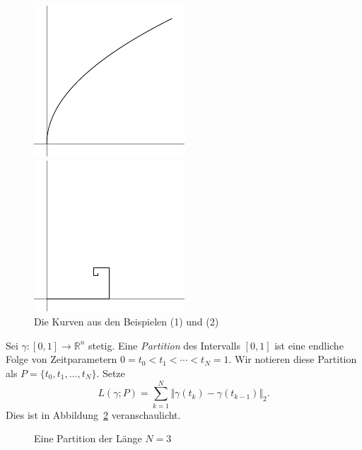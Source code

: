 \documentclass[../main.tex]{subfiles}
\begin{document}
\begin{figure}[htb] 
  \centering
  \begin{minipage}{0.50\textwidth}
    \centering
    \includegraphics{figures/sqrt}
  \end{minipage}%
  \begin{minipage}{0.50\textwidth}
    \centering
    \includegraphics{figures/spiral}
  \end{minipage}%
  \caption{Die Kurven aus den Beispielen (1) und (2)}%
  \label{fig:rectifiability}
\end{figure}

\begin{definition}
  Sei $\gamma \colon [0, 1] \to \mathbb{R}^n$ stetig.
  Eine \emph{Partition} des Intervalls
  $[0, 1]$ ist eine endliche Folge
  von Zeitparametern $0 = t_0 < t_1 < \cdots < t_N = 1$.
  Wir notieren diese Partition als
  $P = \{t_0, t_1, \dots, t_N\}$.
  Setze
  \[
    L(\gamma ; P) =
    \sum_{k=1}^{N}  \Vert \gamma(t_k) - \gamma(t_{k-1}) \Vert_2.
  \]
  Dies ist in Abbildung~\ref{fig:def-rectifiability} veranschaulicht.
\end{definition}

\begin{figure}[htb]
    \centering
    \caption{Eine Partition der Länge $N = 3$}%
    \label{fig:def-rectifiability}
\end{figure}
\end{document}
